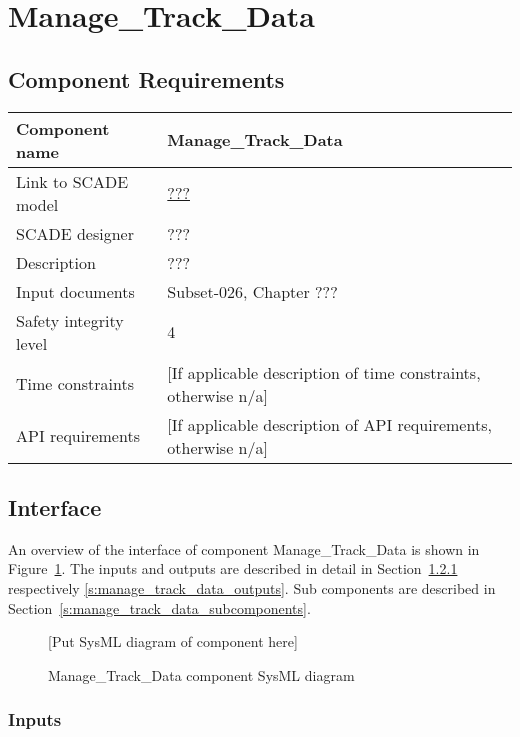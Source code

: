 
\section{Manage\_Track\_Data}

\subsection{Component Requirements}

\begin{longtable}{p{}p{}}
\toprule
Component name			& Manage\_Track\_Data \\
\midrule
Link to SCADE model		& {\footnotesize \url{???}} \\
\midrule
SCADE designer			& ??? \\
\midrule
Description				& ??? \\
\midrule
Input documents	& 
Subset-026, Chapter ???\\
\midrule
Safety integrity level		& 4 \\
\midrule
Time constraints		& [If applicable description of time constraints, otherwise n/a] \\
\midrule
API requirements 		& [If applicable description of API requirements, otherwise n/a] \\
\bottomrule
\end{longtable}


\subsection{Interface}

An overview of the interface of component Manage\_Track\_Data is shown in Figure~\ref{f:manage_track_data_interface}. The inputs and outputs are described in detail in Section~\ref{s:manage_track_data_inputs} respectively \ref{s:manage_track_data_outputs}. Sub components are described in Section~\ref{s:manage_track_data_subcomponents}.

\begin{figure}
\center
{[Put SysML diagram of component here]}
\caption{Manage\_Track\_Data component SysML diagram}\label{f:manage_track_data_interface}
\end{figure}


\subsubsection{Inputs}\label{s:manage_track_data_inputs}

